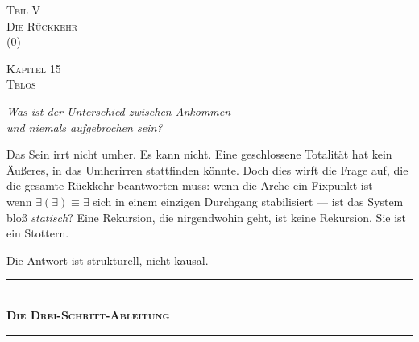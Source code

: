 \documentclass[10pt, openany, oneside]{book}
\renewcommand{\normalsize}{\fontsize{10}{13}\selectfont}
\renewcommand{\large}{\fontsize{11.5}{14}\selectfont}
\renewcommand{\LARGE}{\fontsize{15}{18}\selectfont}
\renewcommand{\huge}{\fontsize{17}{21}\selectfont}
\begin{document}
\newpage
\thispagestyle{empty}
\vspace*{\fill}
\begin{center}
    {\LARGE\scshape Teil V}\\[1em]
    {\large\scshape Die Rückkehr}\\[0.5em]
    {\normalsize ($0$)}
\end{center}
\vspace*{\fill}
\newpage


\newpage

\begin{center}
    {\huge\scshape Kapitel 15}\\[0.3em]
    {\large\scshape Telos}
\end{center}

\vspace{1.5em}

\begin{center}
    \itshape
    Was ist der Unterschied zwischen Ankommen\\
    und niemals aufgebrochen sein?
\end{center}

\vspace{2em}

\noindent Das Sein irrt nicht umher. Es kann nicht. Eine geschlossene Totalität hat kein Äußeres, in das Umherirren stattfinden könnte. Doch dies wirft die Frage auf, die die gesamte Rückkehr beantworten muss: wenn die Arch\={e} ein Fixpunkt ist --- wenn $\exists(\exists) \equiv \exists$ sich in einem einzigen Durchgang stabilisiert --- ist das System bloß \textit{statisch}? Eine Rekursion, die nirgendwohin geht, ist keine Rekursion. Sie ist ein Stottern.

Die Antwort ist strukturell, nicht kausal.

\vspace{1.5em}

\begin{center}
    \rule{0.3\textwidth}{0.4pt}\\[0.5em]
    {\normalsize\bfseries\scshape Die Drei-Schritt-Ableitung}\\[0.3em]
    \rule{0.3\textwidth}{0.4pt}
\end{center}
\end{document}
